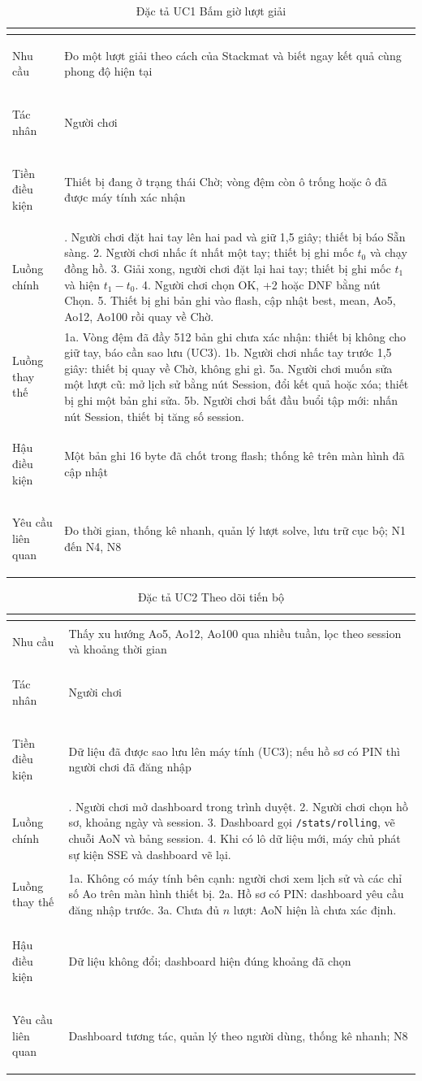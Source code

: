\newcommand{\ucspec}[8]{%
\begin{table}[H]
    \centering
    \small
    \renewcommand{\arraystretch}{1.3}
    \caption{Đặc tả #1}
    \begin{tabular}{>{\bfseries\raggedright\arraybackslash}m{2.8cm} >{\raggedright\arraybackslash}m{11.4cm}}
        \toprule
        \rowcolor{haitayblue}
        \multicolumn{2}{l}{\textcolor{white}{\textbf{#1}}} \\
        \midrule
        \rowcolor{haitayblue!8}
        Nhu cầu & #2 \\
        Tác nhân & #3 \\
        \rowcolor{haitayblue!8}
        Tiền điều kiện & #4 \\
        Luồng chính & #5 \\
        \rowcolor{haitayblue!8}
        Luồng thay thế & #6 \\
        Hậu điều kiện & #7 \\
        \rowcolor{haitayblue!8}
        Yêu cầu liên quan & #8 \\
        \bottomrule
    \end{tabular}
\end{table}}

\ucspec{UC1 Bấm giờ lượt giải}
{Đo một lượt giải theo cách của Stackmat và biết ngay kết quả cùng phong độ hiện tại}
{Người chơi}
{Thiết bị đang ở trạng thái Chờ; vòng đệm còn ô trống hoặc ô đã được máy tính xác nhận}
{1. Người chơi đặt hai tay lên hai pad và giữ 1,5 giây; thiết bị báo Sẵn sàng. 2. Người chơi nhấc ít nhất một tay; thiết bị ghi mốc $t_0$ và chạy đồng hồ. 3. Giải xong, người chơi đặt lại hai tay; thiết bị ghi mốc $t_1$ và hiện $t_1 - t_0$. 4. Người chơi chọn OK, +2 hoặc DNF bằng nút Chọn. 5. Thiết bị ghi bản ghi vào flash, cập nhật best, mean, Ao5, Ao12, Ao100 rồi quay về Chờ.}
{1a. Vòng đệm đã đầy 512 bản ghi chưa xác nhận: thiết bị không cho giữ tay, báo cần sao lưu (UC3). 1b. Người chơi nhấc tay trước 1,5 giây: thiết bị quay về Chờ, không ghi gì. 5a. Người chơi muốn sửa một lượt cũ: mở lịch sử bằng nút Session, đổi kết quả hoặc xóa; thiết bị ghi một bản ghi sửa. 5b. Người chơi bắt đầu buổi tập mới: nhấn nút Session, thiết bị tăng số session.}
{Một bản ghi 16 byte đã chốt trong flash; thống kê trên màn hình đã cập nhật}
{Đo thời gian, thống kê nhanh, quản lý lượt solve, lưu trữ cục bộ; N1 đến N4, N8}

\ucspec{UC2 Theo dõi tiến bộ}
{Thấy xu hướng Ao5, Ao12, Ao100 qua nhiều tuần, lọc theo session và khoảng thời gian}
{Người chơi}
{Dữ liệu đã được sao lưu lên máy tính (UC3); nếu hồ sơ có PIN thì người chơi đã đăng nhập}
{1. Người chơi mở dashboard trong trình duyệt. 2. Người chơi chọn hồ sơ, khoảng ngày và session. 3. Dashboard gọi \texttt{/stats/rolling}, vẽ chuỗi AoN và bảng session. 4. Khi có lô dữ liệu mới, máy chủ phát sự kiện SSE và dashboard vẽ lại.}
{1a. Không có máy tính bên cạnh: người chơi xem lịch sử và các chỉ số Ao trên màn hình thiết bị. 2a. Hồ sơ có PIN: dashboard yêu cầu đăng nhập trước. 3a. Chưa đủ $n$ lượt: AoN hiện là chưa xác định.}
{Dữ liệu không đổi; dashboard hiện đúng khoảng đã chọn}
{Dashboard tương tác, quản lý theo người dùng, thống kê nhanh; N8}

